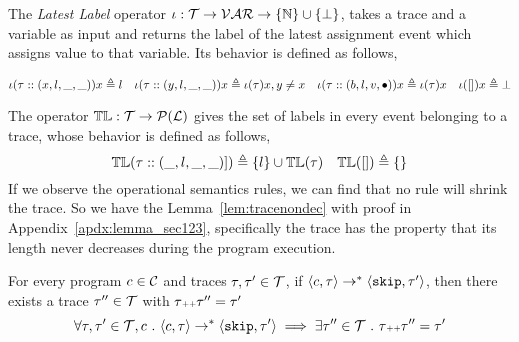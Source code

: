 The \emph{Latest Label}
operator $\iota : \mathcal{T} \to \mathcal{VAR} \to \{\mathbb{N}\}\cup \{\bot\}$,
takes a trace and a variable as input and returns the label of the latest assignment event which assigns value to that variable. 
  Its behavior is defined as follows,
  \begin{defn}
    \[
    \iota(\mathtt{\tau}  :: (x, l, \_, \_)) x \triangleq l
    ~~~
    \iota(\mathtt{\tau}  :: (y, l, \_, \_)) x \triangleq \iota(\mathtt{\tau} ) x, y \neq x
    ~~~
    \iota(\mathtt{\tau} :: (b, l, v, \bullet)) x \triangleq \iota(\mathtt{\tau}) x
    ~~~
    \iota({[]}) x \triangleq \bot
    \]
  \end{defn}
    The operator $\mathbb{TL} : \mathcal{T} \to \mathcal{P}{(\mathcal{L})}$ gives the set of labels in every event belonging to 
    a trace, whose behavior is defined as follows,
  \[
  \mathbb{TL}{(\mathtt{\tau}  :: (\_, l, \_, \_)])} \triangleq \{l\} \cup \mathbb{TL}{(\mathtt{\tau} )}
  ~~~
  \mathbb{TL}({[ ]}) \triangleq \{\}
  \]
  If we observe the operational semantics rules, we can find that no rule will shrink the trace. 
  So we have the Lemma~\ref{lem:tracenondec} with proof in Appendix~\ref{apdx:lemma_sec123}, 
  specifically the trace has the property that its length never decreases during the program execution.
  \begin{lem}
  \label{lem:tracenondec}
  For every program $c \in \mathcal{C}$ and traces $\mathtt{\tau}, \mathtt{\tau}' \in \mathcal{T}$, if 
  $\langle c, \mathtt{\tau} \rangle \rightarrow^{*} \langle \mathtt{skip}, \mathtt{\tau}' \rangle$,
  then there exists a trace $\mathtt{\tau}'' \in \mathcal{T}$ with $\mathtt{\tau} {\scriptscriptstyle ++} \mathtt{\tau}'' = \mathtt{\tau}'$
  $$
  \forall \mathtt{\tau}, \mathtt{\tau}' \in \mathcal{T}, c ~.~ 
  \langle c, \mathtt{\tau} \rangle \rightarrow^{*} \langle \mathtt{skip}, \mathtt{\tau}' \rangle 
  \implies \exists \mathtt{\tau}'' \in \mathcal{T} ~.~ \mathtt{\tau} {\scriptscriptstyle ++} \mathtt{\tau}'' = \mathtt{\tau}'
  $$
  \end{lem}
